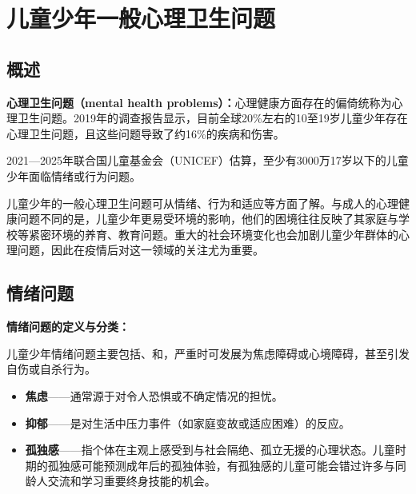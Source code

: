 \section{儿童少年一般心理卫生问题}

\subsection{概述}

\begin{defbox}
\textbf{心理卫生问题（mental health problems）：}心理健康方面存在的偏倚统称为心理卫生问题。2019年的调查报告显示，目前全球20\%左右的10至19岁儿童少年存在心理卫生问题，且这些问题导致了约16\%的疾病和伤害。

2021—2025年联合国儿童基金会（UNICEF）估算，至少有3000万17岁以下的儿童少年面临情绪或行为问题。

儿童少年的一般心理卫生问题可从情绪、行为和适应等方面了解。与成人的心理健康问题不同的是，儿童少年更易受环境的影响，他们的困境往往反映了其家庭与学校等紧密环境的养育、教育问题。重大的社会环境变化也会加剧儿童少年群体的心理问题，因此在疫情后对这一领域的关注尤为重要。
\end{defbox}

\subsection{情绪问题}

\begin{keybox}
\textbf{情绪问题的定义与分类：}

儿童少年情绪问题主要包括、和，严重时可发展为焦虑障碍或心境障碍，甚至引发自伤或自杀行为。

\begin{itemize}[leftmargin=*]
    \item \textbf{焦虑}——通常源于对令人恐惧或不确定情况的担忧。
    \item \textbf{抑郁}——是对生活中压力事件（如家庭变故或适应困难）的反应。
    \item \textbf{孤独感}——指个体在主观上感受到与社会隔绝、孤立无援的心理状态。儿童时期的孤独感可能预测成年后的孤独体验，有孤独感的儿童可能会错过许多与同龄人交流和学习重要终身技能的机会。
\end{itemize}
\end{keybox}

